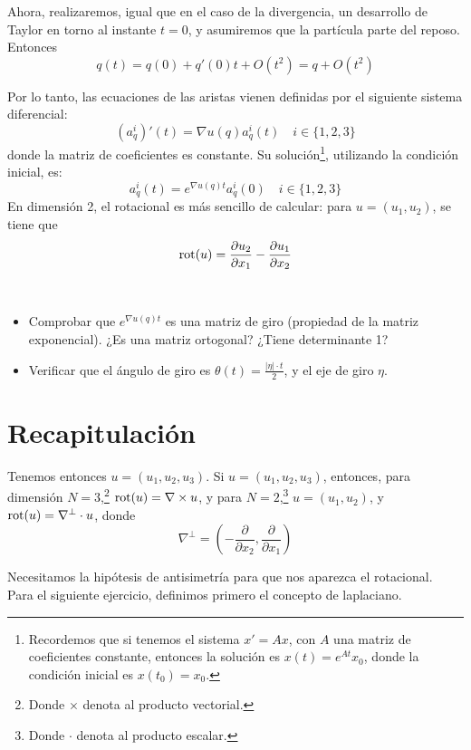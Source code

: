 Ahora, realizaremos, igual que en el caso de la divergencia, un desarrollo de Taylor en torno al instante $t=0$, y asumiremos que la partícula
parte del reposo. Entonces
$$q(t) = q(0) + q'(0)t + O(t^2) = q + O(t^2)$$

Por lo tanto, las ecuaciones de las aristas vienen definidas por el siguiente sistema diferencial:
$$(a_q^i)'(t) = \nabla u (q) a_q^i(t) \quad i \in \{1,2,3\}$$
donde la matriz de coeficientes es constante. Su solución\footnote{Recordemos que si tenemos el sistema $x' = Ax$, con $A$ una
matriz de coeficientes constante, entonces la solución es $x(t) = e^{At}x_0$, donde la condición inicial es $x(t_0) = x_0$.}, utilizando la condición inicial, es:
$$a_q^i(t) = e^{\nabla u (q) t} a_q^i(0) \quad i \in \{1,2,3\}$$
En dimensión 2, el rotacional es más sencillo de calcular: para $u = (u_1, u_2)$, se tiene que
$$\text{rot}(u) = \dfrac{\partial u_2}{\partial x_1} - \dfrac{\partial u_1}{\partial x_2}$$


\begin{ejercicio}~
    \begin{itemize}
        \item[i)] Comprobar que $e^{\nabla u(q) t}$ es una matriz de giro (propiedad de la matriz exponencial). ¿Es una matriz ortogonal? ¿Tiene determinante 1? \\
        \item[ii)] Verificar que el ángulo de giro es $\theta(t) = \frac{|\eta| \cdot t}{2}$, y el eje de giro $\eta$. 
    \end{itemize}
\end{ejercicio}

\section{Recapitulación}

Tenemos entonces $u = (u_1, u_2, u_3)$. Si $u = (u_1, u_2, u_3)$, entonces, para dimensión $N = 3$,\footnote{Donde $\times$ denota al producto vectorial.} $\text{rot}(u) = \nabla \times u$, y para 
$N = 2$,\footnote{Donde $\cdot$ denota al producto escalar.} $u = (u_1, u_2)$, y $\text{rot}(u) = \nabla^{\perp} \cdot u$, donde $$\nabla^{\perp} = \left( - \dfrac{\partial}{\partial x_2}, 
\dfrac{\partial}{\partial x_1} \right)$$

Necesitamos la hipótesis de antisimetría para que nos aparezca el rotacional. \\

Para el siguiente ejercicio, definimos primero el concepto de laplaciano. \\

